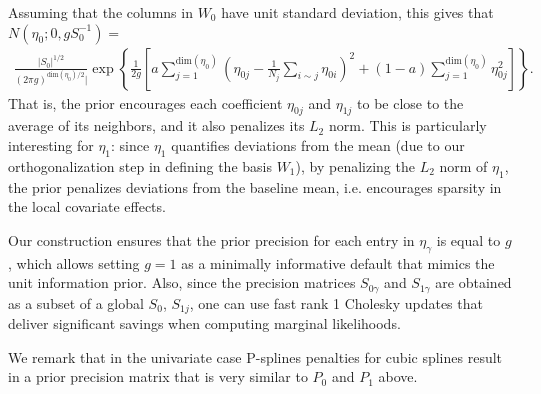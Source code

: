 Assuming that the columns in $W_0$ have unit standard deviation, this gives that
$N\left(\eta_0; 0, g S_{0}^{-1}   \right)=$
\begin{align}
\frac{|S_0|^{1/2}}{(2\pi g)^{\mbox{dim}(\eta_0)/2}|}
\exp \left\{ \frac{1}{2g} \left[ 
a \sum_{j=1}^{\mbox{dim}(\eta_0)} \left( \eta_{0j} - \frac{1}{N_j} \sum_{i \sim j} \eta_{0i}  \right)^2
+ (1-a) \sum_{j=1}^{\mbox{dim}(\eta_0)} \eta_{0j}^2 \right] \right\}.
\nonumber
\end{align}
That is, the prior encourages each coefficient $\eta_{0j}$ and $\eta_{1j}$ to be close to the average of its neighbors, and it also penalizes its $L_2$ norm.
This is particularly interesting for $\eta_1$: since $\eta_1$ quantifies deviations from the mean (due to our orthogonalization step in defining the basis $W_1$), by penalizing the $L_2$ norm of $\eta_1$, the prior penalizes deviations from the baseline mean, i.e. encourages sparsity in the local covariate effects.

% 

Our construction ensures that the prior precision for each entry in $\eta_\gamma$ is equal to $g$, which allows setting $g=1$ as a minimally informative default that mimics the unit information prior. Also, since the precision matrices $S_{0\gamma}$ and $S_{1\gamma}$ are obtained as a subset of a global $S_0$, $S_{1j}$, one can use fast rank 1 Cholesky updates that deliver significant savings when computing marginal likelihoods.

We remark that in the univariate case P-splines penalties for cubic splines \cite{eilers:1996} result in a prior precision matrix that is very similar to $P_0$ and $P_1$ above.


